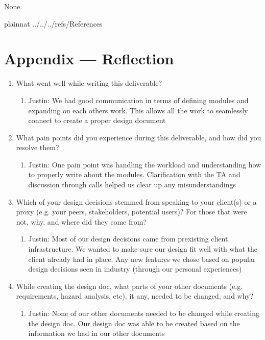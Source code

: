 \documentclass[12pt, titlepage]{article}
\begin{document}
None.

\newpage

 {plainnat}
 {../../../refs/References}

\newpage

\section*{Appendix --- Reflection}

\begin{enumerate}
  \item What went well while writing this deliverable? 
  \begin{enumerate}
    \item Justin: We had good communication in terms of defining modules and expanding on each others work. This allows all the work to seamlessly connect to create a proper design document
  \end{enumerate}
  \item What pain points did you experience during this deliverable, and how
  did you resolve them?
  \begin{enumerate}
    \item Justin: One pain point was handling the workload and understanding how to properly write about the modules. Clarification with the TA and discussion through calls helped us clear up any misunderstandings
  \end{enumerate}
  \item Which of your design decisions stemmed from speaking to your client(s)
  or a proxy (e.g. your peers, stakeholders, potential users)? For those that
  were not, why, and where did they come from?
  \begin{enumerate}
    \item Justin: Most of our design decisions came from prexisting client infrastructure. We wanted to make sure our design fit well with what the client already had in place. Any new features we chose based on popular design decisions seen in industry (through our personal experiences)
  \end{enumerate}
  \item While creating the design doc, what parts of your other documents (e.g.
  requirements, hazard analysis, etc), it any, needed to be changed, and why?
  \begin{enumerate}
    \item Justin: None of our other documents needed to be changed while creating the design doc. Our design doc was able to be created based on the information we had in our other documents

\end{enumerate}
\end{enumerate}
\end{document}
